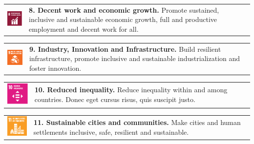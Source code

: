 \begin{multicols}{2}
    \noindent
    \begin{tabular}{p{25mm} p{46mm}}
        \vspace{0mm} \includegraphics[width=2cm]{text/appendix/appendix-sdg/resources/sdg8.pdf} & \vspace{-0.5mm} \textbf{8. Decent work and economic growth.} Promote sustained, inclusive and sustainable economic growth, full and productive employment and decent work for all. \\
    \end{tabular}

    \noindent
    \begin{tabular}{p{25mm} p{46mm}}
        \vspace{0mm} \includegraphics[width=2cm]{text/appendix/appendix-sdg/resources/sdg9.pdf} & \vspace{-0.5mm} \textbf{9. Industry, Innovation and Infrastructure.} Build resilient infrastructure, promote inclusive and sustainable industrialization and foster innovation. \\
    \end{tabular}

    \noindent
    \begin{tabular}{p{25mm} p{46mm}}
        \vspace{0mm} \includegraphics[width=2cm]{text/appendix/appendix-sdg/resources/sdg10.pdf} & \vspace{-0.5mm} \textbf{10. Reduced inequality.} Reduce inequality within and among countries. Donec eget cursus risus, quis suscipit justo. \\
    \end{tabular}

    \noindent
    \begin{tabular}{p{25mm} p{46mm}}
        \vspace{0mm} \includegraphics[width=2cm]{text/appendix/appendix-sdg/resources/sdg11.pdf} & \vspace{-0.5mm} \textbf{11. Sustainable cities and communities.} Make cities and human settlements inclusive, safe, resilient and sustainable. \\
    \end{tabular}


\end{multicols}
